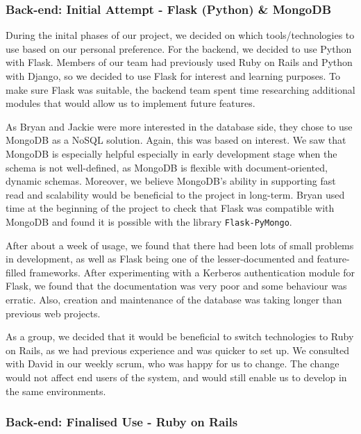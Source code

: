 \documentclass[a4paper, titlepage]{article}
\begin{document}
\subsubsection{Back-end: Initial Attempt - Flask (Python) \& MongoDB}

During the inital phases of our project, we decided on which tools/technologies to use based on our personal preference. For the backend, we decided to use Python with Flask. Members of our team had previously used Ruby on Rails and Python with Django, so we decided to use Flask for interest and 
learning purposes. To make sure Flask was suitable, the backend team spent time researching additional 
modules that would allow us to implement future features.


As Bryan and Jackie were more interested in the database side, they chose to use MongoDB as a NoSQL
solution. Again, this was based on interest. We saw that MongoDB is  especially helpful especially in 
early development stage when the schema is not well-defined, as MongoDB is flexible with 
document-oriented, dynamic schemas. Moreover, we believe MongoDB's ability in supporting fast read and 
scalability would be beneficial to the project in long-term. Bryan used time at the beginning of the 
project to check that Flask was compatible with MongoDB and found it is possible with the library 
\texttt{Flask-PyMongo}.


After about a week of usage, we found that there had been lots of small problems in development, as 
well as Flask being one of the lesser-documented and feature-filled frameworks. After experimenting 
with a Kerberos authentication module for Flask, we found that the documentation was very poor and some 
behaviour was erratic. Also, creation and maintenance of the database was taking longer than previous 
web projects. 

As a group, we decided that it would be beneficial to switch technologies to Ruby on Rails, as we had
previous experience and was quicker to set up. We consulted with David in our weekly scrum, who was
happy for us to change. The change would not affect end users of the system, and would still enable us 
to develop in the same environments. 

\subsubsection{Back-end: Finalised Use - Ruby on Rails} \label{sec:impl_RoR}
\end{document}
